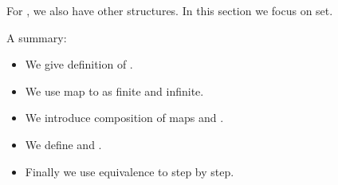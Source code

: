 \documentclass{article}
\begin{document}
 
 
For , we also have other structures. In this section we focus on set. 

A summary:
\begin{itemize}[$\blacktriangleright$]
\item We give definition of .
\item We use map to  as finite and infinite.
\item We introduce composition of maps and .
\item We define  and .
\item Finally we use equivalence to  step by step.
\end{itemize}
\end{document}
